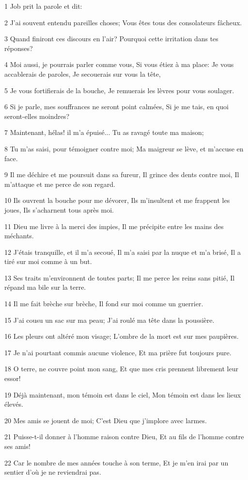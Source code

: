 \par 1 Job prit la parole et dit:
\par 2 J'ai souvent entendu pareilles choses; Vous êtes tous des consolateurs fâcheux.
\par 3 Quand finiront ces discours en l'air? Pourquoi cette irritation dans tes réponses?
\par 4 Moi aussi, je pourrais parler comme vous, Si vous étiez à ma place: Je vous accablerais de paroles, Je secouerais sur vous la tête,
\par 5 Je vous fortifierais de la bouche, Je remuerais les lèvres pour vous soulager.
\par 6 Si je parle, mes souffrances ne seront point calmées, Si je me tais, en quoi seront-elles moindres?
\par 7 Maintenant, hélas! il m'a épuisé... Tu as ravagé toute ma maison;
\par 8 Tu m'as saisi, pour témoigner contre moi; Ma maigreur se lève, et m'accuse en face.
\par 9 Il me déchire et me poursuit dans sa fureur, Il grince des dents contre moi, Il m'attaque et me perce de son regard.
\par 10 Ils ouvrent la bouche pour me dévorer, Ils m'insultent et me frappent les joues, Ils s'acharnent tous après moi.
\par 11 Dieu me livre à la merci des impies, Il me précipite entre les mains des méchants.
\par 12 J'étais tranquille, et il m'a secoué, Il m'a saisi par la nuque et m'a brisé, Il a tiré sur moi comme à un but.
\par 13 Ses traits m'environnent de toutes parts; Il me perce les reins sans pitié, Il répand ma bile sur la terre.
\par 14 Il me fait brèche sur brèche, Il fond sur moi comme un guerrier.
\par 15 J'ai cousu un sac sur ma peau; J'ai roulé ma tête dans la poussière.
\par 16 Les pleurs ont altéré mon visage; L'ombre de la mort est sur mes paupières.
\par 17 Je n'ai pourtant commis aucune violence, Et ma prière fut toujours pure.
\par 18 O terre, ne couvre point mon sang, Et que mes cris prennent librement leur essor!
\par 19 Déjà maintenant, mon témoin est dans le ciel, Mon témoin est dans les lieux élevés.
\par 20 Mes amis se jouent de moi; C'est Dieu que j'implore avec larmes.
\par 21 Puisse-t-il donner à l'homme raison contre Dieu, Et au fils de l'homme contre ses amis!
\par 22 Car le nombre de mes années touche à son terme, Et je m'en irai par un sentier d'où je ne reviendrai pas.

